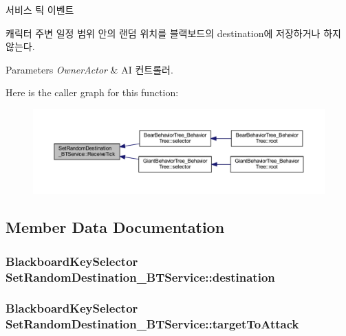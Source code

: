 서비스 틱 이벤트 

캐릭터 주변 일정 범위 안의 랜덤 위치를 블랙보드의 destination에 저장하거나 하지 않는다. 
\begin{DoxyParams}{Parameters}
{\em Owner\+Actor} & AI 컨트롤러. \\
\hline
\end{DoxyParams}


Here is the caller graph for this function\+:\nopagebreak
\begin{figure}[H]
\begin{center}
\leavevmode
\includegraphics[width=350pt]{class_set_random_destination___b_t_service_a5aaffbeccd6db37b168d93ec1f056464_icgraph}
\end{center}
\end{figure}




\subsection{Member Data Documentation}
\subsubsection[{\texorpdfstring{destination}{destination}}]{\setlength{\rightskip}{0pt plus 5cm}Blackboard\+Key\+Selector Set\+Random\+Destination\+\_\+\+B\+T\+Service\+::destination}\hypertarget{class_set_random_destination___b_t_service_ab259c7024b387a7320ea85e5df8d7016}{}\label{class_set_random_destination___b_t_service_ab259c7024b387a7320ea85e5df8d7016}
\subsubsection[{\texorpdfstring{target\+To\+Attack}{targetToAttack}}]{\setlength{\rightskip}{0pt plus 5cm}Blackboard\+Key\+Selector Set\+Random\+Destination\+\_\+\+B\+T\+Service\+::target\+To\+Attack}\hypertarget{class_set_random_destination___b_t_service_a6c67414130286ac84e546e73af226b2c}{}\label{class_set_random_destination___b_t_service_a6c67414130286ac84e546e73af226b2c}

